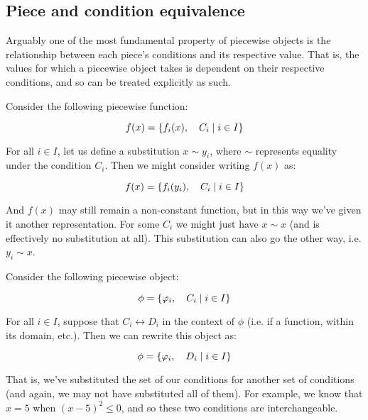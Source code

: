 \subsection{Piece and condition equivalence}
Arguably one of the most fundamental property of piecewise objects is the relationship between each piece's conditions and its respective value. That is, the values for which a piecewise object takes is dependent on their respective conditions, and so can be treated explicitly as such.

\begin{theorem}
    Consider the following piecewise function:

    $$
        f(x) = \{f_i(x),\quad C_i\mid i\in I\}
    $$

    For all $i\in I$, let us define a substitution $x\sim y_i$, where $\sim$ represents equality under the condition $C_i$. Then we might consider writing $f(x)$ as:

    $$
        f(x) = \{f_i(y_i),\quad C_i\mid i\in I\}
    $$

    And $f(x)$ may still remain a non-constant function, but in this way we've given it another representation. For some $C_i$ we might just have $x\sim x$ (and is effectively no substitution at all). This substitution can also go the other way, i.e. $y_i\sim x$.
\end{theorem}

\begin{theorem}
    Consider the following piecewise object:

    $$
        \phi=\{\varphi_i,\quad C_i\mid i\in I\}
    $$

    For all $i\in I$, suppose that $C_i \leftrightarrow D_i$ in the context of $\phi$ (i.e. if a function, within its domain, etc.). Then we can rewrite this object as:

    $$
        \phi=\{\varphi_i,\quad D_i\mid i\in I\}
    $$ 

    That is, we've substituted the set of our conditions for another set of conditions (and again, we may not have substituted all of them). For example, we know that $x=5$ when $(x-5)^2\leq 0$, and so these two conditions are interchangeable.
\end{theorem}

